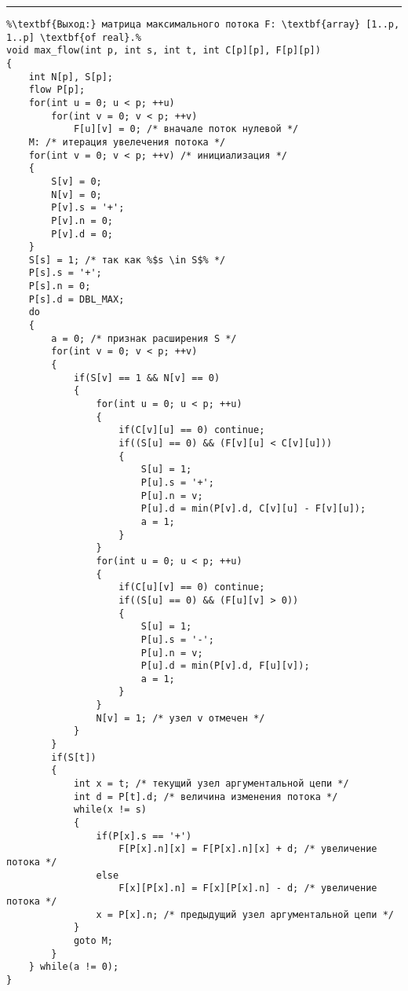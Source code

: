 \vspace{5pt} \hrule
\begin{lstlisting}[caption={Нахождение максимального потока}, label=p279_max_flow, escapechar=\%]
%\noindent\textbf{Вход:} сеть G(V, E) с источником s и стоком t, заданная матрицей пропускных способностей C: \textbf{array} [1..p, 1..p] \textbf{of real}.\\%
%\textbf{Выход:} матрица максимального потока F: \textbf{array} [1..p, 1..p] \textbf{of real}.%
void max_flow(int p, int s, int t, int C[p][p], F[p][p])
{
	int N[p], S[p];
	flow P[p];
	for(int u = 0; u < p; ++u)
		for(int v = 0; v < p; ++v)
			F[u][v] = 0; /* вначале поток нулевой */
	M: /* итерация увелечения потока */
	for(int v = 0; v < p; ++v) /* инициализация */
	{
		S[v] = 0;
		N[v] = 0;
		P[v].s = '+';
		P[v].n = 0;
		P[v].d = 0;
	}
	S[s] = 1; /* так как %$s \in S$% */
	P[s].s = '+';
	P[s].n = 0;
	P[s].d = DBL_MAX;
	do
	{
		a = 0; /* признак расширения S */
		for(int v = 0; v < p; ++v)
		{
			if(S[v] == 1 && N[v] == 0)
			{
				for(int u = 0; u < p; ++u)
				{
					if(C[v][u] == 0) continue;
					if((S[u] == 0) && (F[v][u] < C[v][u]))
	  				{
						S[u] = 1;
						P[u].s = '+';
						P[u].n = v;
						P[u].d = min(P[v].d, C[v][u] - F[v][u]);
						a = 1;
					}
				}
				for(int u = 0; u < p; ++u)
				{
					if(C[u][v] == 0) continue;
					if((S[u] == 0) && (F[u][v] > 0))
					{
						S[u] = 1;
						P[u].s = '-';
						P[u].n = v;
						P[u].d = min(P[v].d, F[u][v]);
						a = 1;
					}
				}
				N[v] = 1; /* узел v отмечен */
			}
		}
		if(S[t])
		{
			int x = t; /* текущий узел аргументальной цепи */
			int d = P[t].d; /* величина изменения потока */
			while(x != s)
			{
				if(P[x].s == '+')
					F[P[x].n][x] = F[P[x].n][x] + d; /* увеличение потока */
				else
					F[x][P[x].n] = F[x][P[x].n] - d; /* увеличение потока */
				x = P[x].n; /* предыдущий узел аргументальной цепи */
			}
			goto M;
		}
	} while(a != 0);
}
\end{lstlisting}
